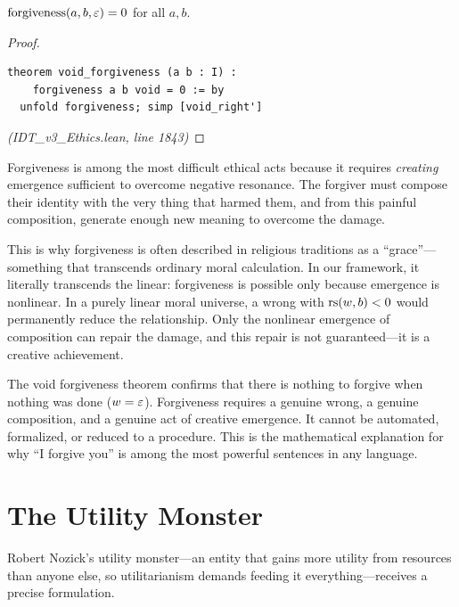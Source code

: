 \begin{theorem}
\label{thm:void-forgiveness}
$\mathrm{forgiveness}(a, b, \varepsilon) = 0$ for all $a, b$.
\end{theorem}

\begin{proof}
\begin{lstlisting}
theorem void_forgiveness (a b : I) :
    forgiveness a b void = 0 := by
  unfold forgiveness; simp [void_right']
\end{lstlisting}
\textit{(IDT\_v3\_Ethics.lean, line 1843)}
\end{proof}

\begin{interpretation}
Forgiveness is among the most difficult ethical acts because it requires
\emph{creating} emergence sufficient to overcome negative resonance.
The forgiver must compose their identity with the very thing that harmed
them, and from this painful composition, generate enough new meaning to
overcome the damage.

This is why forgiveness is often described in religious traditions as a
``grace''---something that transcends ordinary moral calculation. In our
framework, it literally transcends the linear: forgiveness is possible
only because emergence is nonlinear. In a purely linear moral universe,
a wrong with $\mathrm{rs}(w, b) < 0$ would permanently reduce the relationship.
Only the nonlinear emergence of composition can repair the damage, and
this repair is not guaranteed---it is a creative achievement.

The void forgiveness theorem confirms that there is nothing to forgive
when nothing was done ($w = \varepsilon$). Forgiveness requires a genuine
wrong, a genuine composition, and a genuine act of creative emergence.
It cannot be automated, formalized, or reduced to a procedure. This is
the mathematical explanation for why ``I forgive you'' is among the
most powerful sentences in any language.
\end{interpretation}

\section{The Utility Monster}
\label{sec:utility-monster}

Robert Nozick's utility monster---an entity that gains more utility from
resources than anyone else, so utilitarianism demands feeding it
everything---receives a precise formulation.

